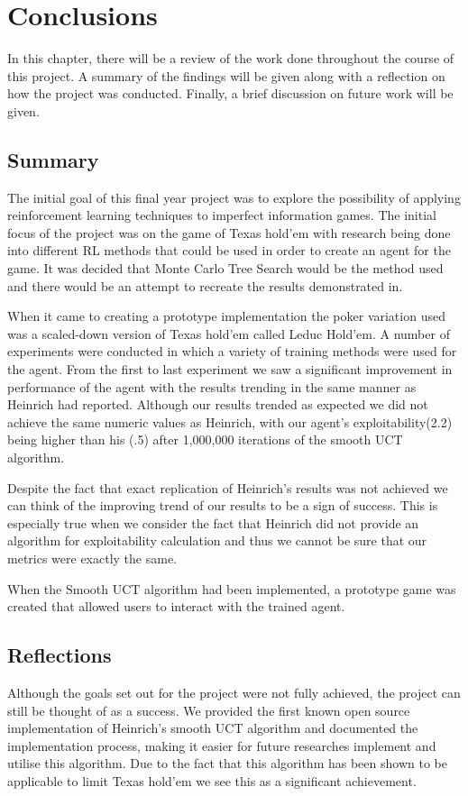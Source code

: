 \chapter{Conclusions}\label{ch:conclusions}
In this chapter, there will be a review of the work done throughout the course of this project.
A summary of the findings will be given along with a reflection on how the project was conducted.
Finally, a brief discussion on future work will be given.

\section{Summary}\label{sec:summary}
The initial goal of this final year project was to explore the possibility of applying
reinforcement learning techniques to imperfect information games.
The initial focus of the project was on the game of Texas hold'em with research being
done into different RL methods that could be used in order to create an agent for the game.
It was decided that Monte Carlo Tree Search would be the method used and there would be
an attempt to recreate the results demonstrated in\citep{heinrich2017reinforcement}.

When it came to creating a prototype implementation the poker variation used was a
scaled-down version of Texas hold'em called Leduc Hold'em.
A number of experiments were conducted in which a variety of training methods were used
for the agent.
From the first to last experiment we saw a significant improvement in performance of the
agent with the results trending in the same manner as Heinrich had reported.
Although our results trended as expected we did not achieve the same numeric values as Heinrich,
with our agent's exploitability(2.2) being higher than his (.5) after 1,000,000
iterations of the smooth UCT algorithm.

Despite the fact that exact replication of Heinrich's results was not achieved we can
think of the improving trend of our results to be a sign of success.
This is especially true when we consider the fact that Heinrich did not provide
an algorithm for exploitability calculation and thus we cannot be sure that our metrics
were exactly the same.

When the Smooth UCT algorithm had been implemented, a prototype game was created that
allowed users to interact with the trained agent.

\section{Reflections}\label{sec:reflections}
Although the goals set out for the project were not fully achieved, the project can
still be thought of as a success.
We provided the first known open source implementation of Heinrich's smooth UCT algorithm and
documented the implementation process, making it easier for future researches implement and
utilise this algorithm.
Due to the fact that this algorithm has been shown to be applicable to limit Texas hold'em\citep{heinrich2015smooth}
we see this as a significant achievement.

